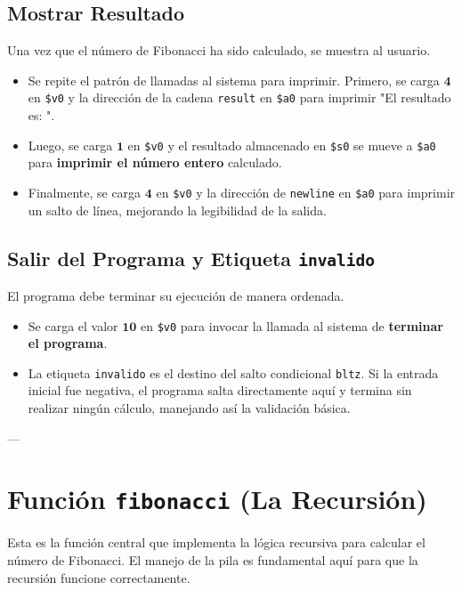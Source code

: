 \documentclass{article}
\begin{document}
\subsection*{Mostrar Resultado}
Una vez que el número de Fibonacci ha sido calculado, se muestra al usuario.
\begin{itemize}
    \item Se repite el patrón de llamadas al sistema para imprimir. Primero, se carga $\mathbf{4}$ en \texttt{\$v0} y la dirección de la cadena \texttt{result} en \texttt{\$a0} para imprimir "El resultado es: ".
    \item Luego, se carga $\mathbf{1}$ en \texttt{\$v0} y el resultado almacenado en \texttt{\$s0} se mueve a \texttt{\$a0} para \textbf{imprimir el número entero} calculado.
    \item Finalmente, se carga $\mathbf{4}$ en \texttt{\$v0} y la dirección de \texttt{newline} en \texttt{\$a0} para imprimir un salto de línea, mejorando la legibilidad de la salida.
\end{itemize}

\subsection*{Salir del Programa y Etiqueta \texttt{invalido}}
El programa debe terminar su ejecución de manera ordenada.
\begin{itemize}
    \item Se carga el valor $\mathbf{10}$ en \texttt{\$v0} para invocar la llamada al sistema de \textbf{terminar el programa}.
    \item La etiqueta \texttt{invalido} es el destino del salto condicional \texttt{bltz}. Si la entrada inicial fue negativa, el programa salta directamente aquí y termina sin realizar ningún cálculo, manejando así la validación básica.
\end{itemize}

---

\section{Función \texttt{fibonacci} (La Recursión)}
Esta es la función central que implementa la lógica recursiva para calcular el número de Fibonacci. El manejo de la pila es fundamental aquí para que la recursión funcione correctamente.
\end{document}
